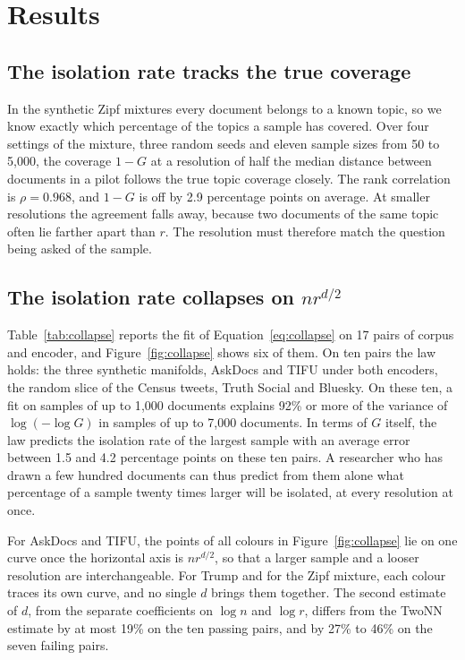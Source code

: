 \section{Results}

\subsection{The isolation rate tracks the true coverage}

In the synthetic Zipf mixtures every document belongs to a known topic, so we know exactly which percentage of the topics a sample has covered. Over four settings of the mixture, three random seeds and eleven sample sizes from 50 to 5{,}000, the coverage $1 - G$ at a resolution of half the median distance between documents in a pilot follows the true topic coverage closely. The rank correlation is $\rho = 0.968$, and $1 - G$ is off by 2.9 percentage points on average. At smaller resolutions the agreement falls away, because two documents of the same topic often lie farther apart than $r$. The resolution must therefore match the question being asked of the sample.

\subsection{The isolation rate collapses on $n r^{d/2}$}
\label{sec:collapse}

Table~\ref{tab:collapse} reports the fit of Equation~\ref{eq:collapse} on 17 pairs of corpus and encoder, and Figure~\ref{fig:collapse} shows six of them. On ten pairs the law holds: the three synthetic manifolds, AskDocs and TIFU under both encoders, the random slice of the Census tweets, Truth Social and Bluesky. On these ten, a fit on samples of up to 1{,}000 documents explains 92\% or more of the variance of $\log(-\log G)$ in samples of up to 7{,}000 documents. In terms of $G$ itself, the law predicts the isolation rate of the largest sample with an average error between 1.5 and 4.2 percentage points on these ten pairs. A researcher who has drawn a few hundred documents can thus predict from them alone what percentage of a sample twenty times larger will be isolated, at every resolution at once.

For AskDocs and TIFU, the points of all colours in Figure~\ref{fig:collapse} lie on one curve once the horizontal axis is $n r^{d/2}$, so that a larger sample and a looser resolution are interchangeable. For Trump and for the Zipf mixture, each colour traces its own curve, and no single $d$ brings them together. The second estimate of $d$, from the separate coefficients on $\log n$ and $\log r$, differs from the TwoNN estimate by at most 19\% on the ten passing pairs, and by 27\% to 46\% on the seven failing pairs.

